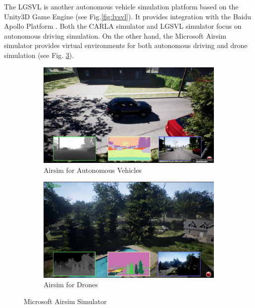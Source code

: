 The LGSVL is another autonomous vehicle simulation platform based on the Unity3D Game Engine (see Fig.\ref{fig:lvsvl}). It provides integration with the Baidu Apollo Platform \citep{rong2020lgsvl}. Both the CARLA simulator and LGSVL simulator focus on autonomous driving simulation. On the other hand, the Microsoft Airsim simulator provides virtual environments for both autonomous driving and drone simulation \citep{airsim2017fsr} (see Fig. \ref{fig.airsim}).

\begin{figure}[H]
\centering
\begin{subfigure}[b]{0.49\textwidth}
    \centering
    \includegraphics[width=\textwidth]{figures/chapter_intro/airsim_car.jpg}
    \caption{Airsim for Autonomous Vehicles}
    \label{fig:airsim_car}
\end{subfigure}
\hfill
\begin{subfigure}[b]{0.49\textwidth}
    \centering
    \includegraphics[width=\textwidth]{figures/chapter_intro/airsim_drone.jpg}
    \caption{Airsim for Drones}
    \label{fig:airsim_drone}
\end{subfigure}
\hfill
\caption{Microsoft Airsim Simulator \citep{airsim2017fsr}}
\label{fig.airsim}
\end{figure}

